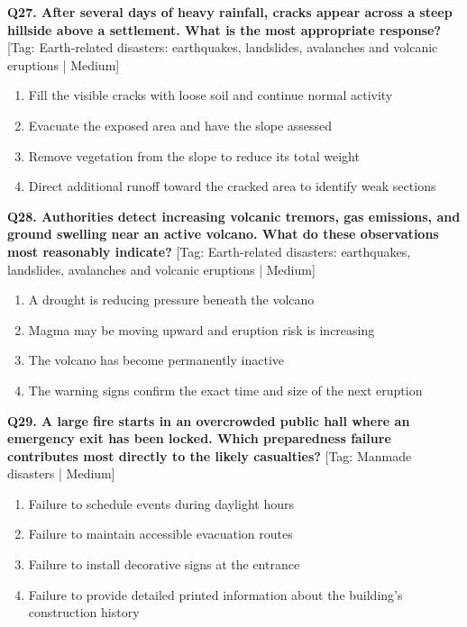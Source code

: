 \noindent\textbf{Q27. After several days of heavy rainfall, cracks appear across a steep hillside above a settlement. What is the most appropriate response?} \hfill [Tag: Earth-related disasters: earthquakes, landslides, avalanches and volcanic eruptions | Medium]
\begin{enumerate}[label=(\alph*),topsep=2pt,itemsep=1pt,partopsep=0pt,parsep=0pt]
    \item {Fill the visible cracks with loose soil and continue normal activity}
    \item {Evacuate the exposed area and have the slope assessed}
    \item {Remove vegetation from the slope to reduce its total weight}
    \item {Direct additional runoff toward the cracked area to identify weak sections}
\end{enumerate}
\vspace{2mm}

\noindent\textbf{Q28. Authorities detect increasing volcanic tremors, gas emissions, and ground swelling near an active volcano. What do these observations most reasonably indicate?} \hfill [Tag: Earth-related disasters: earthquakes, landslides, avalanches and volcanic eruptions | Medium]
\begin{enumerate}[label=(\alph*),topsep=2pt,itemsep=1pt,partopsep=0pt,parsep=0pt]
    \item {A drought is reducing pressure beneath the volcano}
    \item {Magma may be moving upward and eruption risk is increasing}
    \item {The volcano has become permanently inactive}
    \item {The warning signs confirm the exact time and size of the next eruption}
\end{enumerate}
\vspace{2mm}

\noindent\textbf{Q29. A large fire starts in an overcrowded public hall where an emergency exit has been locked. Which preparedness failure contributes most directly to the likely casualties?} \hfill [Tag: Manmade disasters | Medium]
\begin{enumerate}[label=(\alph*),topsep=2pt,itemsep=1pt,partopsep=0pt,parsep=0pt]
    \item {Failure to schedule events during daylight hours}
    \item {Failure to maintain accessible evacuation routes}
    \item {Failure to install decorative signs at the entrance}
    \item {Failure to provide detailed printed information about the building's construction history}
\end{enumerate}
\vspace{2mm}

